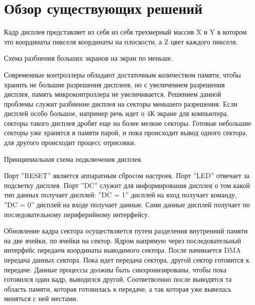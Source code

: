 \chapter{Обзор существующих решений}

	Кадр дисплея представляет из себя из себя трехмерный массив X и Y в котором это координаты пикселя координаты на плоскости, а Z цвет каждого пикселя. 
	
	{Схема разбиения больших экранов на экран по меньше.} %
	
	Современные контроллеры обладают достаточным количеством памяти, чтобы хранить не большие разрешения дисплеев, но с увеличением разрешения дисплея, память микроконтроллера не увеличивается. Решением данной проблемы служит разбиение дисплея на секторы меньшего разрешения. Если дисплей особо большое, например речь идет о 4К экране для компьютера, секторы такого дисплея дробят еще на более мелкие секторы. Готовые небольшие секторы уже хранятся в памяти парой, и пока происходит вывод одного сектора, для другого происходит процесс отрисовки.
	
	{Принципиальная схема подключения дисплея.} %
	
	Порт ''RESET'' является аппаратным сбросом настроек. Порт ''LED'' отвечает за подсветку дисплея. Порт ''DC'' служит для информирования дисплея о том какой тип данных получает дисплей: ''DC = 1'' дисплей на вход получает команду, ''DC = 0'' дисплей на входе получает данные. Сами данные дисплей получает по последовательному периферийному интерфейсу.
	
	Обновление кадра сектора осуществляется путем разделения внутренний памяти на две ячейки, по ячейки на сектор. Ядром напрямую через последовательный интерфейс передаем координаты выводимого сектора. После начинается DMA передача данных сектора. Пока идет передача сектора, другой сектор готовится к передаче. Данные процессы должны быть синхронизированы, чтобы пока готовился один кадр, выводился другой. Соответвсенно после выводятся та область памяти, которая готовилась к передаче, а так которая уже вывелась меняться с ней местами.

	
	
